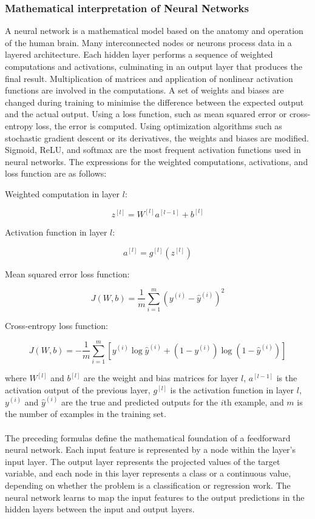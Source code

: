 \documentclass{article}[12pt]
\newcounter{example}[section]
\theoremstyle{definition}
\begin{document}
\newpage

\bigskip

\subsubsection{Mathematical interpretation of Neural Networks}

\bigskip

A neural network is a mathematical model based on the anatomy and operation of the human brain. Many interconnected nodes or neurons process data in a layered architecture. Each hidden layer performs a sequence of weighted computations and activations, culminating in an output layer that produces the final result. Multiplication of matrices and application of nonlinear activation functions are involved in the computations. A set of weights and biases are changed during training to minimise the difference between the expected output and the actual output. Using a loss function, such as mean squared error or cross-entropy loss, the error is computed. Using optimization algorithms such as stochastic gradient descent or its derivatives, the weights and biases are modified. Sigmoid, ReLU, and softmax are the most frequent activation functions used in neural networks. The expressions for the weighted computations, activations, and loss function are as follows:

\bigskip

Weighted computation in layer $l$:

$$z^{[l]} = W^{[l]}a^{[l-1]} + b^{[l]}$$

Activation function in layer $l$:

$$a^{[l]} = g^{[l]}(z^{[l]})$$

Mean squared error loss function:

$$J(W,b) = \frac{1}{m}\sum_{i=1}^{m}(y^{(i)} - \hat{y}^{(i)})^2$$

Cross-entropy loss function:

$$J(W,b) = -\frac{1}{m}\sum_{i=1}^{m}[y^{(i)}\log\hat{y}^{(i)} + (1-y^{(i)})\log(1-\hat{y}^{(i)})]$$

\noindent
where $W^{[l]}$ and $b^{[l]}$ are the weight and bias matrices for layer $l$, $a^{[l-1]}$ is the activation output of the previous layer, $g^{[l]}$ is the activation function in layer $l$, $y^{(i)}$ and $\hat{y}^{(i)}$ are the true and predicted outputs for the $i$th example, and $m$ is the number of examples in the training set.
\\
\\ 
The preceding formulas define the mathematical foundation of a feedforward neural network. Each input feature is represented by a node within the layer's input layer. The output layer represents the projected values of the target variable, and each node in this layer represents a class or a continuous value, depending on whether the problem is a classification or regression work. The neural network learns to map the input features to the output predictions in the hidden layers between the input and output layers. 
\end{document}
